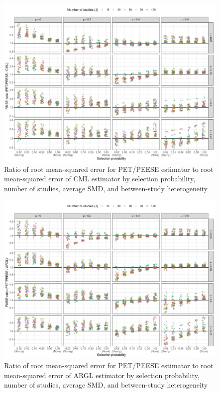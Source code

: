 \documentclass[
  man, donotrepeattitle,floatsintext]{apa7}
\begin{document}
\begin{figure}
\includegraphics{selection_models_draft_files/figure-latex/rmse-PET-CML-1} \caption{Ratio of root mean-squared error for PET/PEESE estimator to root mean-squared error of CML estimator by selection probability, number of studies, average SMD, and between-study heterogeneity}\label{fig:rmse-PET-CML}
\end{figure}

\begin{figure}
\includegraphics{selection_models_draft_files/figure-latex/rmse-PET-ARGL-1} \caption{Ratio of root mean-squared error for PET/PEESE estimator to root mean-squared error of ARGL estimator by selection probability, number of studies, average SMD, and between-study heterogeneity}\label{fig:rmse-PET-ARGL}
\end{figure}
\end{document}
